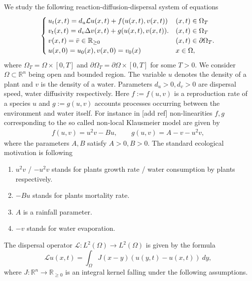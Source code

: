 \documentclass[12pt, a4paper]{article}
\theoremstyle{break}
\theoremstyle{break}
\theoremstyle{break}
\theoremstyle{break}
\theoremstyle{break}
\theoremstyle{break}
\theoremstyle{break}
\begin{document}
We study the following reaction-diffusion-dispersal system of equations
\begin{align}
    \label{EQ:KlausmeierSystem}
    \begin{cases}
        u_t(x,t) = d_u\mathcal{L} u(x, t) + f(u(x,t), v(x,t)) &(x, t) \in \Omega_T \\
        v_t(x,t) = d_v\Delta v(x,t) + g(u(x,t), v(x,t)). &(x, t) \in \Omega_T \\
        v(x,t) = \Bar{v} \in \mathbb{R}_{\geq 0} &(x, t) \in \partial\Omega_T. \\
        u(x,0) = u_0(x), v(x,0) = v_0(x) &x \in \Omega,
    \end{cases}
\end{align}
where $\Omega_T = \Omega \times [0, T]$ and $\partial\Omega_T = \partial\Omega \times [0, T]$ for some $T > 0$. We consider $\Omega \subset \mathbb{R}^n$ being open and bounded region. The variable $u$ denotes the density of a plant and $v$ is the density of a water. Parameters $d_u > 0, d_v > 0$ are dispersal speed, water diffusivity respectively. Here $f := f(u, v)$ is a reproduction rate of a species $u$ and $g := g(u, v)$ accounts processes occurring between the environment and water itself. For instance in [add ref] non-linearities $f, g$ corresponding to the so called non-local Klausmeier model are given by
\begin{align}
    \label{EQ:KlausmeierNonliniearities}
    f(u, v) = u^2 v - B u, \quad\quad g(u, v) = A - v - u^2 v,
\end{align}
where the parameters $A, B$ satisfy $A > 0, B > 0$. The standard ecological motivation is following
\begin{enumerate}
    \item $u^2 v$ / $-u^2 v$ stands for plants growth rate / water consumption by plants respectively.
    \item $-Bu$ stands for plants mortality rate.
    \item $A$ is a rainfall parameter.
    \item $- v$ stands for water evaporation.
\end{enumerate}
The dispersal operator $\mathcal{L} : L^2(\Omega) \rightarrow L^2(\Omega)$ is given by the formula
\begin{equation}
    \mathcal{L}u(x, t) = \int_\Omega J(x-y)\left(u(y, t) - u(x, t)\right)\:dy,
\end{equation}
where $J : \mathbb{R}^n \rightarrow \mathbb{R}_{\geq 0}$ is an integral kernel falling under the following assumptions.
\end{document}
